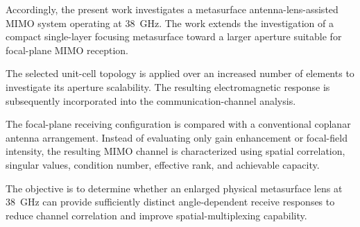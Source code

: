 Accordingly, the present work investigates a metasurface
antenna-lens-assisted MIMO system operating at 38~GHz. The work
extends the investigation of a compact single-layer focusing
metasurface toward a larger aperture suitable for focal-plane MIMO
reception.

The selected unit-cell topology is applied over an increased number
of elements to investigate its aperture scalability. The resulting
electromagnetic response is subsequently incorporated into the
communication-channel analysis.

The focal-plane receiving configuration is compared with a
conventional coplanar antenna arrangement. Instead of evaluating only
gain enhancement or focal-field intensity, the resulting MIMO channel
is characterized using spatial correlation, singular values,
condition number, effective rank, and achievable capacity.

The objective is to determine whether an enlarged physical
metasurface lens at 38~GHz can provide sufficiently distinct
angle-dependent receive responses to reduce channel correlation and
improve spatial-multiplexing capability.


